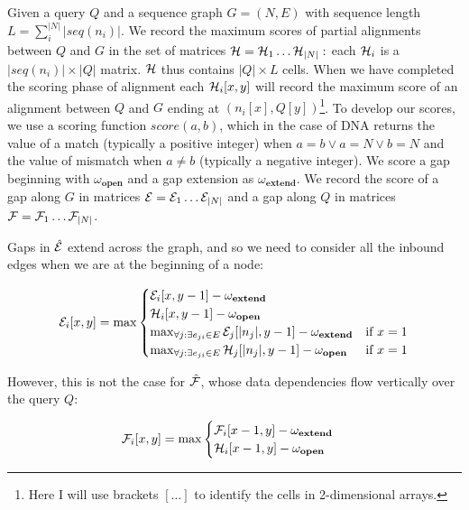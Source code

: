 Given a query $Q$ and a sequence graph $G = (N, E)$ with sequence length $L=\sum_{i}^{|N|} |seq(n_i)|$.
We record the maximum scores of partial alignments between $Q$ and $G$ in the set of matrices ${\cal H} = {\cal H}_1 \ldots {\cal H}_{|N|} :$ each ${\cal H}_i$ is a $|seq(n_i)| \times |Q|$ matrix.
${\cal H}$ thus contains $|Q|\times L$ cells.
When we have completed the scoring phase of alignment each ${\cal H}_{i}[x,y]$ will record the maximum score of an alignment between $Q$ and $G$ ending at $(n_i[x], Q[y])$\footnote{Here I will use brackets $[\ldots]$ to identify the cells in 2-dimensional arrays.}.
To develop our scores, we use a scoring function $score(a, b)$, which in the case of DNA returns the value of a match (typically a positive integer) when $a = b \lor a = N \lor b = N$ and the value of mismatch when $a \neq b$ (typically a negative integer).
We score a gap beginning with $\omega_\textbf{open}$ and a gap extension as $\omega_\textbf{extend}$.
We record the score of a gap along $G$ in matrices ${\cal E} = {\cal E}_1 \ldots {\cal E}_{|N|}$ and a gap along $Q$ in matrices ${\cal F} = {\cal F}_1 \ldots {\cal F}_{|N|}$.

Gaps in $\hat{\cal E}$ extend across the graph, and so we need to consider all the inbound edges when we are at the beginning of a node:

\begin{equation}
  {\cal E}_i[x,y] = \max
  \begin{cases}
    {\cal E}_i[x,y-1] - \omega_\textbf{extend} \\
    {\cal H}_i[x,y-1] - \omega_\textbf{open} \\
    \max_{\forall j : \exists e_{ji} \in E} {\cal E}_j[|n_j|,y-1] - \omega_\textbf{extend} & \text{if } x = 1 \\
    \max_{\forall j : \exists e_{ji} \in E} {\cal H}_j[|n_j|,y-1] - \omega_\textbf{open} & \text{if } x = 1 \\
  \end{cases}
\end{equation}

However, this is not the case for $\hat{\cal F}$, whose data dependencies flow vertically over the query $Q$:

\begin{equation}
  {\cal F}_i[x,y] = \max
  \begin{cases}
    {\cal F}_i[x-1,y] - \omega_\textbf{extend} \\
    {\cal H}_i[x-1,y] - \omega_\textbf{open} \\
  \end{cases}
\end{equation}


